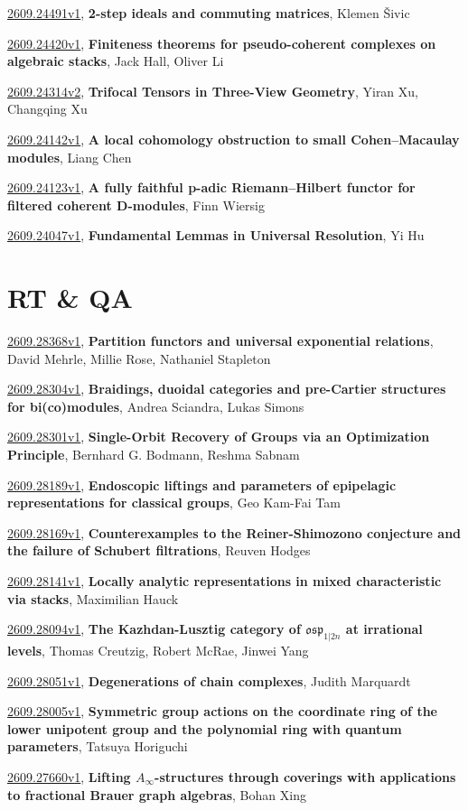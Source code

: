 \documentclass[9pt, a4paper]{article}
\theoremstyle{plain}
\theoremstyle{definition}
\theoremstyle{remark}
\newcommand{\arxiv}[3]{\href{https://arxiv.org/abs/#1}{#1}, \textbf{\textcolor{arxivblue}{#2}}, #3}
\begin{document}
\arxiv{2609.24491v1}{2-step ideals and commuting matrices}{Klemen Šivic}

\arxiv{2609.24420v1}{Finiteness theorems for pseudo-coherent complexes on algebraic stacks}{Jack Hall, Oliver Li}

\arxiv{2609.24314v2}{Trifocal Tensors in Three-View Geometry}{Yiran Xu, Changqing Xu}

\arxiv{2609.24142v1}{A local cohomology obstruction to small Cohen--Macaulay modules}{Liang Chen}

\arxiv{2609.24123v1}{A fully faithful p-adic Riemann--Hilbert functor for filtered coherent D-modules}{Finn Wiersig}

\arxiv{2609.24047v1}{Fundamental Lemmas in Universal Resolution}{Yi Hu}


\section{RT \& QA}
\arxiv{2609.28368v1}{Partition functors and universal exponential relations}{David Mehrle, Millie Rose, Nathaniel Stapleton}

\arxiv{2609.28304v1}{Braidings, duoidal categories and pre-Cartier structures for bi(co)modules}{Andrea Sciandra, Lukas Simons}

\arxiv{2609.28301v1}{Single-Orbit Recovery of Groups via an Optimization Principle}{Bernhard G. Bodmann, Reshma Sabnam}

\arxiv{2609.28189v1}{Endoscopic liftings and parameters of epipelagic representations for classical groups}{Geo Kam-Fai Tam}

\arxiv{2609.28169v1}{Counterexamples to the Reiner-Shimozono conjecture and the failure of Schubert filtrations}{Reuven Hodges}

\arxiv{2609.28141v1}{Locally analytic representations in mixed characteristic via stacks}{Maximilian Hauck}

\arxiv{2609.28094v1}{The Kazhdan-Lusztig category of $\mathfrak{osp}_{1|2n}$ at irrational levels}{Thomas Creutzig, Robert McRae, Jinwei Yang}

\arxiv{2609.28051v1}{Degenerations of chain complexes}{Judith Marquardt}

\arxiv{2609.28005v1}{Symmetric group actions on the coordinate ring of the lower unipotent group and the polynomial ring with quantum parameters}{Tatsuya Horiguchi}

\arxiv{2609.27660v1}{Lifting $A_\infty$-structures through coverings with applications to fractional Brauer graph algebras}{Bohan Xing}
\end{document}
